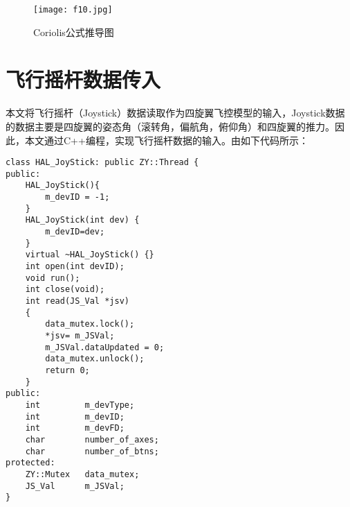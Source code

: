 \begin{figure}[!ht]
\centering
\texttt{[image: f10.jpg]}
\caption{Coriolis公式推导图}
\label{fig9}
\end{figure}



\section{飞行摇杆数据传入}
本文将飞行摇杆（Joystick）数据读取作为四旋翼飞控模型的输入，Joystick数据的数据主要是四旋翼的姿态角（滚转角，偏航角，俯仰角）和四旋翼的推力。因此，本文通过C++编程，实现飞行摇杆数据的输入。由如下代码所示：

\begin{lstlisting}[language={[ANSI]C++}]
class HAL_JoyStick: public ZY::Thread {
public:
    HAL_JoyStick(){
        m_devID = -1;
    }
    HAL_JoyStick(int dev) {
        m_devID=dev;
    }
    virtual ~HAL_JoyStick() {}
    int open(int devID);
    void run();
    int close(void);
    int read(JS_Val *jsv)
    {
        data_mutex.lock();
        *jsv= m_JSVal;
        m_JSVal.dataUpdated = 0;
        data_mutex.unlock();
        return 0;
    }
public:
    int         m_devType;
    int         m_devID;
    int         m_devFD;
    char        number_of_axes;
    char        number_of_btns;
protected:
    ZY::Mutex   data_mutex;
    JS_Val      m_JSVal;
}
\end{lstlisting}



